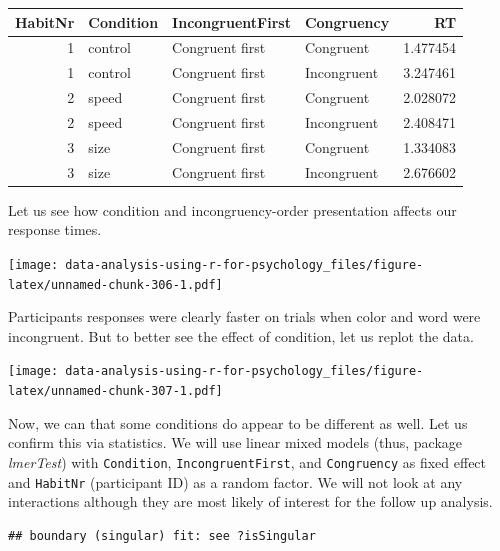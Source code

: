 \documentclass[
]{book}
\begin{document}
\begin{tabular}{r|l|l|l|r}
\hline
HabitNr & Condition & IncongruentFirst & Congruency & RT\\
\hline
1 & control & Congruent first & Congruent & 1.477454\\
\hline
1 & control & Congruent first & Incongruent & 3.247461\\
\hline
2 & speed & Congruent first & Congruent & 2.028072\\
\hline
2 & speed & Congruent first & Incongruent & 2.408471\\
\hline
3 & size & Congruent first & Congruent & 1.334083\\
\hline
3 & size & Congruent first & Incongruent & 2.676602\\
\hline
\end{tabular}

Let us see how condition and incongruency-order presentation affects our response times.

\texttt{[image: data-analysis-using-r-for-psychology\_files/figure-latex/unnamed-chunk-306-1.pdf]}

Participants responses were clearly faster on trials when color and word were incongruent. But to better see the effect of condition, let us replot the data.

\texttt{[image: data-analysis-using-r-for-psychology\_files/figure-latex/unnamed-chunk-307-1.pdf]}

Now, we can that some conditions do appear to be different as well. Let us confirm this via statistics. We will use linear mixed models (thus, package \emph{lmerTest}) with \texttt{Condition}, \texttt{IncongruentFirst}, and \texttt{Congruency} as fixed effect and \texttt{HabitNr} (participant ID) as a random factor. We will not look at any interactions although they are most likely of interest for the follow up analysis.

\begin{verbatim}
## boundary (singular) fit: see ?isSingular
\end{verbatim}
\end{document}
